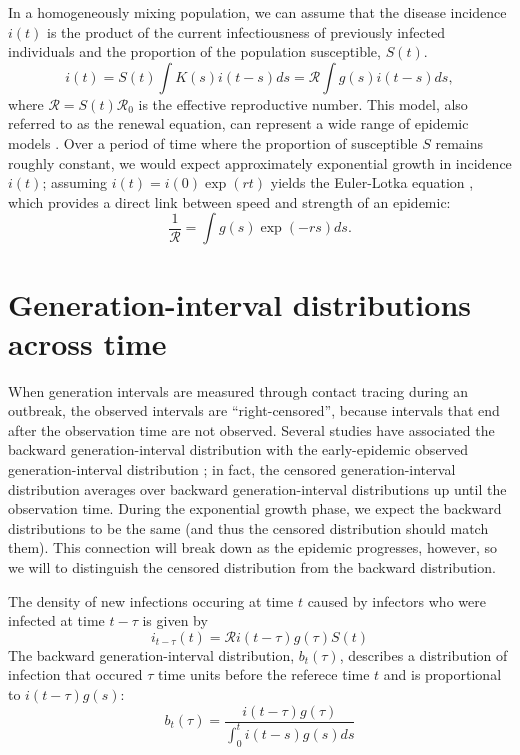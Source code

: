 \documentclass[12pt]{article}
\newcommand{\RR}{\ensuremath{{\mathcal R}}}
\begin{document}
In a homogeneously mixing population, we can assume that the disease incidence $i(t)$ is the product of the current infectiousness of previously infected individuals and the proportion of the population susceptible, $S(t)$.
\begin{equation}
i(t) = S(t) \int K(s) i(t-s) ds = \RR \int g(s) i(t-s) ds,
\end{equation}
where $\RR = S(t) \RR_0$ is the effective reproductive number.
This model, also referred to as the renewal equation, can represent a wide range of epidemic models \citep{heesterbeek1996concept, diekmann2000mathematical, roberts2004modelling, aldis2005integral, wallinga2007generation, roberts2007model}.
Over a period of time where the proportion of susceptible $S$ remains roughly constant, we would expect approximately exponential growth in incidence $i(t)$; assuming $i(t) = i(0) \exp(r t)$ yields the Euler-Lotka equation \citep{lotka1907relation}, which provides a direct link between speed and strength of an epidemic:
\begin{equation}
\frac{1}{\RR} = \int g(s) \exp(-r s) ds.
\end{equation}

\section{Generation-interval distributions across time}

When generation intervals are measured through contact tracing during an outbreak, 
the observed intervals are ``right-censored'', because intervals that end after the observation time are not observed. 
Several studies have associated the backward generation-interval distribution with the early-epidemic observed generation-interval distribution \citep{tomba2010some, nishiura2010time, champredon2015intrinsic, britton2019estimation};
in fact, the censored generation-interval distribution averages over backward generation-interval distributions up until the observation time.
During the exponential growth phase, we expect the backward distributions to be the same (and thus the censored distribution should match them).
This connection will break down as the epidemic progresses, however, so we will to distinguish the censored distribution from the backward distribution.

The density of new infections occuring at time $t$ caused by infectors who were infected at time $t-\tau$ is given by
\begin{equation}
i_{t-\tau}(t) = \RR i(t-\tau) g(\tau) S(t)
\end{equation}
The backward generation-interval distribution, $b_t(\tau)$, describes a distribution of infection that occured $\tau$ time units before the referece time $t$ and is proportional to $i(t-\tau) g(s)$:
\begin{equation}
b_t(\tau) = \frac{i(t-\tau) g(\tau)}{\int_0^t i(t-s) g(s) ds}
\end{equation}
\end{document}
